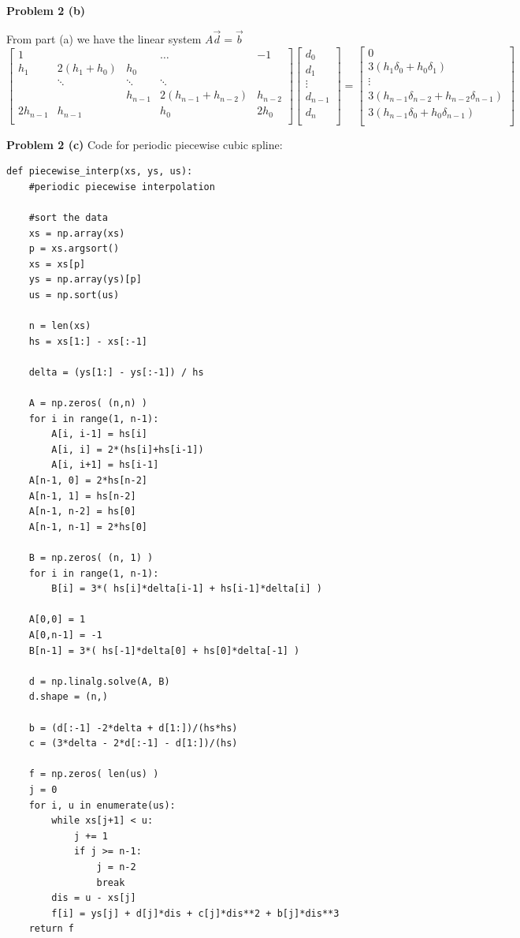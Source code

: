 \documentclass[12pt]{article}
\newcommand{\problem}[1]{\hspace{-4 ex} \large \textbf{Problem #1} }
\begin{document}
\problem{2 (b)}

	From part (a) we have the linear system $A\vec{d} = \vec{b}$
	$$
	\begin{bmatrix}
	1 & & & \dots & -1\\
	h_1 & 2(h_1+h_0) & h_0\\
	& \ddots & \ddots & \ddots \\
	& & h_{n-1} & 2(h_{n-1}+h_{n-2}) & h_{n-2} \\
	2h_{n-1} & h_{n-1} & & h_0 & 2h_0 \\
	\end{bmatrix}
	\begin{bmatrix}
	d_0 \\
	d_1 \\
	\vdots \\
	d_{n-1} \\
	d_n \\
	\end{bmatrix}
	=
	\begin{bmatrix}
	0 \\
	3(h_1\delta_{0} + h_{0}\delta_{1}) \\
	\vdots \\
	3(h_{n-1}\delta_{n-2} + h_{n-2}\delta_{n-1}) \\
	3(h_{n-1}\delta_0 + h_0\delta_{n-1}) \\
	\end{bmatrix}	
	$$
	
\problem{2 (c)} Code for periodic piecewise cubic spline:
	\begin{lstlisting}
def piecewise_interp(xs, ys, us):
	#periodic piecewise interpolation
	
	#sort the data
	xs = np.array(xs)
	p = xs.argsort()
	xs = xs[p]
	ys = np.array(ys)[p]
	us = np.sort(us)
	
	n = len(xs)
	hs = xs[1:] - xs[:-1]
	
	delta = (ys[1:] - ys[:-1]) / hs
	
	A = np.zeros( (n,n) )
	for i in range(1, n-1):
		A[i, i-1] = hs[i]
		A[i, i] = 2*(hs[i]+hs[i-1])
		A[i, i+1] = hs[i-1]
	A[n-1, 0] = 2*hs[n-2]
	A[n-1, 1] = hs[n-2]
	A[n-1, n-2] = hs[0]
	A[n-1, n-1] = 2*hs[0]
	
	B = np.zeros( (n, 1) )
	for i in range(1, n-1):
		B[i] = 3*( hs[i]*delta[i-1] + hs[i-1]*delta[i] )
	
	A[0,0] = 1
	A[0,n-1] = -1
	B[n-1] = 3*( hs[-1]*delta[0] + hs[0]*delta[-1] )
	
	d = np.linalg.solve(A, B)
	d.shape = (n,)
	
	b = (d[:-1] -2*delta + d[1:])/(hs*hs)
	c = (3*delta - 2*d[:-1] - d[1:])/(hs)
	
	f = np.zeros( len(us) )
	j = 0
	for i, u in enumerate(us):
		while xs[j+1] < u:
			j += 1
			if j >= n-1:
				j = n-2
				break
		dis = u - xs[j] 
		f[i] = ys[j] + d[j]*dis + c[j]*dis**2 + b[j]*dis**3
	return f
	\end{lstlisting}
	
\end{document}
